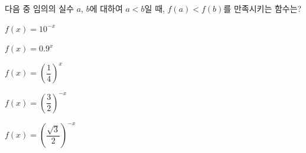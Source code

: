 다음 중 임의의 실수 $a$, $b$에 대하여 $a<b$일 때, $f(a)<f(b)$를 만족시키는 함수는?
\begin{choicesii}{\rule[-3ex]{0pt}{8ex}$f(x)=10^{-x}$}{\rule[-3ex]{0pt}{8ex}$f(x)=0.9^{x}$}{\rule[-3ex]{0pt}{8ex}$f(x)=\left(\dfrac{1}{4}\right)^{x}$}{\rule[-3ex]{0pt}{8ex}$f(x)=\left(\dfrac{3}{2}\right)^{-x}$}{\rule[-3ex]{0pt}{8ex}$f(x)=\left(\dfrac{\sqrt{3}}{2}\right)^{-x}$}\end{choicesii}
